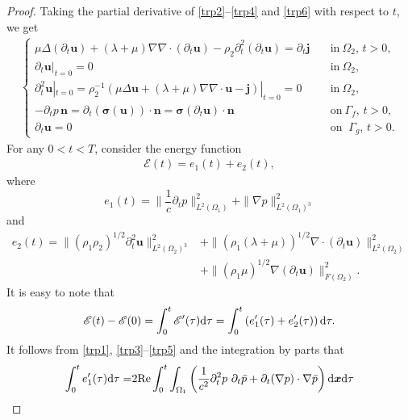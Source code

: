 \documentclass[final,leqno]{siamltex}
\begin{document}
\begin{proof}
Taking the partial derivative of \eqref{trp2}--\eqref{trp4} and \eqref{trp6}
with respect to $t$, we get
\begin{align}\label{fdt}
 \begin{cases}
  \mu \Delta  (\partial_t \boldsymbol u) + (\lambda +\mu ) \nabla \nabla \cdot
(\partial_t \boldsymbol u) -  \rho_2 \partial_t^2 (\partial_t \boldsymbol u) =
\partial_t\boldsymbol j \quad &  \text {in} ~\Omega_2,\,t >0,\\
  \partial_t \boldsymbol u|_{t=0}=0  \quad &\text{in} ~ \Omega_2,\\
  \partial_{t}^2 \boldsymbol u|_{t=0}= \rho_{2}^{-1 } \left(
  \mu \Delta \boldsymbol u + (\lambda+\mu) \nabla \nabla \cdot \boldsymbol u
-\boldsymbol j  \right)|_{t=0}=0 \quad & \text {in}~ \Omega_2,\\
  -\partial_t p\,\boldsymbol n = \partial_t (\boldsymbol \sigma (\boldsymbol u))
\cdot \boldsymbol n  =  \boldsymbol \sigma (\partial_t \boldsymbol u) \cdot
\boldsymbol n \quad &\text {on}~\Gamma_f,\,t>0,\\
  \partial_t \boldsymbol u =0 \quad & \text {on }~\Gamma_g,\,t>0.
 \end{cases}
\end{align}
For any  $0< t < T$, consider the energy  function
\begin{align*}
 \mathscr E (t)= e_1 (t) +e_2 (t),
\end{align*}
where
\[
  e_1 (t)= \| \frac{1}{c} \partial_t p\|^2_{ L^2 (\Omega_1)} +\| \nabla
p\|^2_{L^2 (\Omega_1)^3}
\]
and
\begin{align*}
 e_2 (t)= \|(\rho_1 \rho_2)^{1/2} \partial_t ^2  \boldsymbol u\|^2_{L^2
(\Omega_2)^3} &+\| (\rho_1 (\lambda + \mu))^{1/2} \nabla \cdot (\partial_t
\boldsymbol u)\|^2_{L^2 (\Omega_2)}\\
&+\|(\rho_1\mu)^{1/2}\nabla (\partial_t \boldsymbol u)\|^2_{F (\Omega_2)}.
\end{align*}
It is easy to note that
\begin{align} \label{e00}
 \mathscr E (t) -\mathscr E (0)
 =\int_0^t \mathscr E ' (\tau) {\rm d} \tau = \int_0^t \left ( e_1' (\tau)
+e_2'(\tau) \right) {\rm d} \tau.
 \end{align}
It follows from \eqref{trp1}, \eqref{trp3}--\eqref{trp5} and the integration
by parts that
\begin{align}
\int_0^t e_1' (\tau) {\rm d} \tau
=& 2 {\rm Re } \int_0^t \int_{\Omega_1} \left (\frac{1}{c^2} \partial_t^2 p  ~
\partial_t \bar p + \partial_t  (\nabla p )\cdot  \nabla \bar p \right) {\rm d}
\boldsymbol  x  {\rm d}\tau \nonumber\\

\end{align}
\end{proof}
\end{document}

